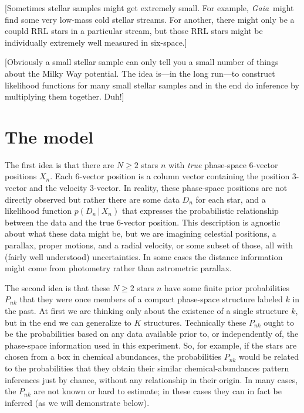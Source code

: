 \documentclass[letterpaper,12pt,preprint]{aastex}
\newcommand{\project}[1]{\textsl{#1}}
\newcommand{\gaia}{\project{Gaia}}
\newcommand{\given}{\,|\,}
\begin{document}
[Sometimes stellar samples might get extremely small.  For example,
  \gaia\ might find some very low-mass cold stellar streams.  For
  another, there might only be a coupld RRL stars in a particular
  stream, but those RRL stars might be individually extremely well
  measured in six-space.]

[Obviously a small stellar sample can only tell you a small number of
  things about the Milky Way potential.  The idea is---in the long
  run---to construct likelihood functions for many small stellar
  samples and in the end do inference by multiplying them together.
  Duh!]

\section{The model}

The first idea is that there are $N\geq 2$ stars $n$ with \emph{true}
phase-space 6-vector positions $X_n$.  Each 6-vector position is a
column vector containing the position 3-vector and the velocity
3-vector.  In reality, these phase-space positions are not directly
observed but rather there are some data $D_n$ for each star, and a
likelihood function $p(D_n\given X_n)$ that expresses the
probabilistic relationship between the data and the true 6-vector
position.  This description is agnostic about what these data might
be, but we are imagining celestial positions, a parallax, proper
motions, and a radial velocity, or some subset of those, all with
(fairly well understood) uncertainties.  In some cases the distance
information might come from photometry rather than astrometric
parallax.

The second idea is that these $N\geq 2$ stars $n$ have some finite
prior probabilities $P_{nk}$ that they were once members of a compact
phase-space structure labeled $k$ in the past.  At first we are
thinking only about the existence of a single structure $k$, but in
the end we can generalize to $K$ structures.  Technically these
$P_{nk}$ ought to be the probabilities based on any data available
prior to, or independently of, the phase-space information used in
this experiment.  So, for example, if the stars are chosen from a box
in chemical abundances, the probabilities $P_{nk}$ would be related to
the probabilities that they obtain their similar chemical-abundances
pattern inferences just by chance, without any relationship in their
origin.  In many cases, the $P_{nk}$ are not known or hard to
estimate; in these cases they can in fact be inferred (as we will
demonstrate below).
\end{document}
